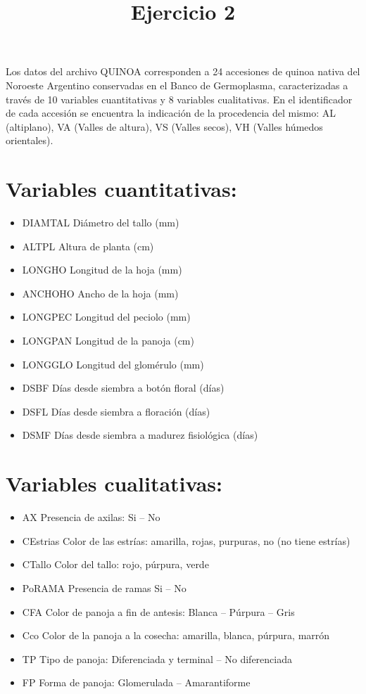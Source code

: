 \documentclass[
]{article}
\title{Ejercicio 2}
\author{}
\date{\vspace{-2.5em}}
\providecommand{\tightlist}{%
  \setlength{\itemsep}{0pt}\setlength{\parskip}{0pt}}
\begin{document}
\maketitle

Los datos del archivo QUINOA corresponden a 24 accesiones de quinoa
nativa del Noroeste Argentino conservadas en el Banco de Germoplasma,
caracterizadas a través de 10 variables cuantitativas y 8 variables
cualitativas. En el identificador de cada accesión se encuentra la
indicación de la procedencia del mismo: AL (altiplano), VA (Valles de
altura), VS (Valles secos), VH (Valles húmedos orientales).

\hypertarget{variables-cuantitativas}{%
\section{Variables cuantitativas:}\label{variables-cuantitativas}}

\begin{itemize}
\tightlist
\item
  DIAMTAL Diámetro del tallo (mm)
\item
  ALTPL Altura de planta (cm)
\item
  LONGHO Longitud de la hoja (mm)
\item
  ANCHOHO Ancho de la hoja (mm)
\item
  LONGPEC Longitud del peciolo (mm)
\item
  LONGPAN Longitud de la panoja (cm)
\item
  LONGGLO Longitud del glomérulo (mm)
\item
  DSBF Días desde siembra a botón floral (días)
\item
  DSFL Días desde siembra a floración (días)
\item
  DSMF Días desde siembra a madurez fisiológica (días)
\end{itemize}

\hypertarget{variables-cualitativas}{%
\section{Variables cualitativas:}\label{variables-cualitativas}}

\begin{itemize}
\tightlist
\item
  AX Presencia de axilas: Si -- No
\item
  CEstrias Color de las estrías: amarilla, rojas, purpuras, no (no tiene
  estrías)
\item
  CTallo Color del tallo: rojo, púrpura, verde
\item
  PoRAMA Presencia de ramas Si -- No
\item
  CFA Color de panoja a fin de antesis: Blanca -- Púrpura -- Gris
\item
  Cco Color de la panoja a la cosecha: amarilla, blanca, púrpura, marrón
\item
  TP Tipo de panoja: Diferenciada y terminal -- No diferenciada
\item
  FP Forma de panoja: Glomerulada -- Amarantiforme
\end{itemize}
\end{document}
